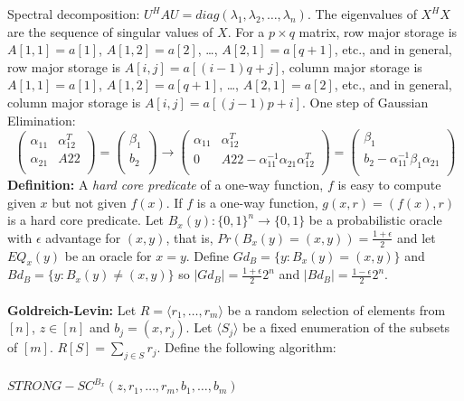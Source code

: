 Spectral decomposition: $U^H A U= diag( \lambda_1 , \lambda_2 , \ldots , \lambda_n)$.
The eigenvalues of $X^H X$ are the sequence of singular values of $X$.
For a $p \times q$ matrix, row major storage is 
$A[1,1]= a[1]$,
$A[1,2]= a[2]$, \ldots, $A[2,1]=a[q+1]$, 
etc., 
and in general,
row major storage is $A[i,j]= a[(i-1)q+j]$,
column major storage is
$A[1,1]= a[1]$,
$A[1,2]= a[q+1]$, \ldots, $A[2,1]=a[2]$,  etc.,
and in general,
column major storage is $A[i,j]= a[(j-1)p+i]$.  One step of Gaussian Elimination:
$$
\left(
\begin{array}{cc}
\alpha_{11} & \alpha_{12}^T\\
\alpha_{21} & A{22}\\
\end{array}\right)=
\left(
\begin{array}{c}
\beta_1\\
b_2\\
\end{array}
\right)
\rightarrow
\left(
\begin{array}{cc}
\alpha_{11} & \alpha_{12}^T\\
0 & A{22}- \alpha_{11}^{-1}\alpha_{21}\alpha_{12}^T\\
\end{array}
\right)=
\left(
\begin{array}{c}
\beta_1\\
b_2- \alpha_{11}^{-1} \beta_1 \alpha_{21}\\
\end{array}
\right)
$$
{\bf Definition:}
A \emph{hard core predicate} of a one-way function, $f$ is easy to compute given $x$ but not
given $f(x)$.  If $f$ is a one-way function, $g(x,r)= (f(x),r)$ is a hard core predicate.
Let $B_x(y): \{0,1\}^n \rightarrow \{0,1\}$ be a probabilistic oracle with
$\epsilon$ advantage for $(x,y)$, that
is, $Pr(B_x(y)=(x,y))= {\frac {1+\epsilon} 2}$ and let $EQ_x(y)$ be an oracle for $x=y$.
Define 
$Gd_B= \{ y: B_x(y)= (x,y) \}$ and
$Bd_B= \{ y: B_x(y) \ne (x,y) \}$ so 
$|Gd_B|= {\frac {1 + \epsilon} 2} 2^n$ and
$|Bd_B|= {\frac {1 - \epsilon} 2} 2^n$.
\\
\\
{\bf Goldreich-Levin:}
Let  $R= \langle r_1, \ldots, r_m \rangle$ be a random selection of elements from
$[n]$, $z \in [n]$ and $b_j=(x,r_j)$.  Let $\langle S_j \rangle$ be a fixed
enumeration of the subsets of $[m]$.  $R[S]= \sum_{j \in S} r_j$.
Define the following algorithm:\\
\\
$STRONG-SC^{B_x}(z, r_1, \ldots, r_m, b_1, \ldots , b_m)$ \\
